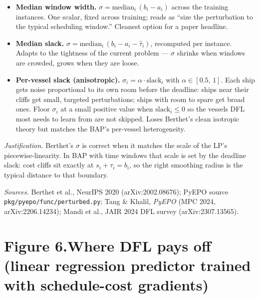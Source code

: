 \documentclass[11pt]{article}
\begin{document}
\begin{itemize}\setlength{\itemsep}{0pt}
  \item \textbf{Median window width.} $\sigma = \mathrm{median}_i\,
        (b_i - a_i)$ across the training instances. One scalar, fixed
        across training; reads as ``size the perturbation to the
        typical scheduling window.'' Cleanest option for a paper
        headline.
  \item \textbf{Median slack.} $\sigma = \mathrm{median}_i\,
        (b_i - a_i - \hat{\tau}_i)$, recomputed per instance. Adapts
        to the tightness of the current problem --- $\sigma$ shrinks
        when windows are crowded, grows when they are loose.
  \item \textbf{Per-vessel slack (anisotropic).} $\sigma_i = \alpha
        \cdot \mathrm{slack}_i$ with $\alpha \in [0.5,\,1]$. Each ship
        gets noise proportional to its own room before the deadline:
        ships near their cliffs get small, targeted perturbations;
        ships with room to spare get broad ones. Floor $\sigma_i$ at a
        small positive value when $\mathrm{slack}_i \leq 0$ so the
        vessels DFL most needs to learn from are not skipped. Loses
        Berthet's clean isotropic theory but matches the BAP's
        per-vessel heterogeneity.
\end{itemize}

\noindent
\emph{Justification.} Berthet's $\sigma$ is correct when it matches
the scale of the LP's piecewise-linearity. In BAP with time windows
that scale is set by the deadline slack: cost cliffs sit exactly at
$s_i + \tau_i = b_i$, so the right smoothing radius is the typical
distance to that boundary.

\vspace{0.4em}

\noindent
\textit{Sources.} Berthet et al., NeurIPS 2020 (arXiv:2002.08676);
PyEPO source \texttt{pkg/pyepo/func/perturbed.py}; Tang \& Khalil,
\emph{PyEPO} (MPC 2024, arXiv:2206.14234); Mandi et al., JAIR 2024
DFL survey (arXiv:2307.13565).

\newpage

\section*{Figure 6.\quad Where DFL pays off
\;\textnormal{\normalsize(linear regression predictor trained with schedule-cost gradients)}}
\end{document}
